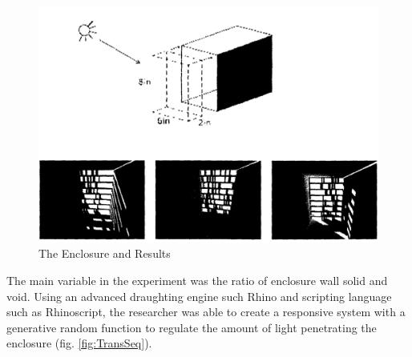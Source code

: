 \begin{figure}[htbp]
\centering
\includegraphics[width=\textwidth]{./Images/1-Enclosure}
\caption[Responsive Adaptable Enclosure Experiment]{The Enclosure and Results \cite{zulas04}}
\label{fig:AZulasEncl}
\end{figure}

The main variable in the experiment was the ratio of enclosure wall solid and void. Using an advanced draughting engine such Rhino and scripting language such as Rhinoscript, the researcher was able to create a responsive system with a generative random function to regulate the amount of light penetrating the enclosure (fig. \ref{fig:TransSeq}).


